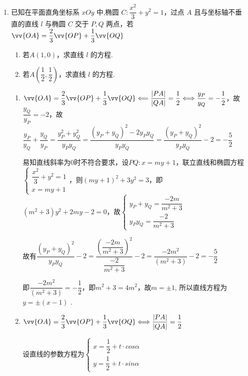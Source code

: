 \begin{enumerate}
\begin{enumerate}
        \item 已知在平面直角坐标系 ${xOy}$ 中,椭圆 $C : \dfrac{{x}^{2}}{3} + y^2 = 1$，过点 $A$ 且与坐标轴不垂直的直线 $l$ 与椭圆 $C$ 交于 $P,Q$ 两点，若 $\vv{OA} = \dfrac{2}{3}\vv{OP} + \dfrac{1}{3}\vv{OQ}$
        \begin{enumerate}
            \item 若$A(1,0)$，求直线 $l$ 的方程.
            \item 若$A\left(\dfrac{1}{2},\dfrac{1}{2} \right)$，求直线 $l$ 的方程.
        \end{enumerate}
        \begin{jieda}
            \begin{enumerate}
                \item $\vv{OA} = \dfrac{2}{3}\vv{OP} + \dfrac{1}{3}\vv{OQ} \Longleftarrow  \dfrac{|PA|}{|QA|} = \dfrac{1}{2} \Longleftrightarrow \dfrac{y_P}{y_Q} = -\dfrac{1}{2}$，故$\dfrac{y_Q}{y_P} = -2$，故$\dfrac{y_P}{y_Q} + \dfrac{y_Q}{y_P} = \dfrac{y_P^2+y_Q^2}{y_Py_Q} = \dfrac{(y_P+y_Q)^2-2y_Py_Q}{y_Py_Q} = \dfrac{(y_P+y_Q)^2}{y_Py_Q} - 2 = -\dfrac{5}{2}$
    
                易知直线斜率为0时不符合要求，设$PQ: x = my + 1$，联立直线和椭圆方程$\left\{\begin{array}{l}
                     \dfrac{{x}^{2}}{3} + y^2 = 1  \\
                     x = my + 1
                \end{array}\right.$，则$(my + 1)^2 + 3y^2 = 3$，即$(m^2+3)y^2+2my-2=0$，故$\left\{\begin{array}{l}
                     y_P+y_Q = \dfrac{-2m}{m^2+3} \\
                     y_Py_Q = \dfrac{-2}{m^2+3}
                \end{array}\right.$
    
                故有$\dfrac{(y_P+y_Q)^2}{y_Py_Q} - 2 = \dfrac{\left(\dfrac{-2m}{m^2+3}\right)^2}{\dfrac{-2}{m^2+3}} - 2 = \dfrac{-2m^2}{(m^2+3)} - 2 = -\dfrac{5}{2}$
    
                即$\dfrac{-2m^2}{(m^2+3)} = -\dfrac{1}{2}$，即$m^2+3 = 4m^2$，故$m = \pm 1$, 所以直线方程为 $y =  \pm \left( {x - 1}\right)$ .
                \item $\vv{OA} = \dfrac{2}{3}\vv{OP} + \dfrac{1}{3}\vv{OQ} \Longleftrightarrow \dfrac{|PA|}{|QA|} = \dfrac{1}{2}$
    
                设直线的参数方程为$\left\{\begin{array}{l}
                     x = \dfrac{1}{2} + t \cdot cos\alpha \\
                     y = \dfrac{1}{2} + t \cdot sin\alpha
                \end{array}\right.$
    

\end{enumerate}
\end{jieda}
\end{enumerate}
\end{enumerate}
